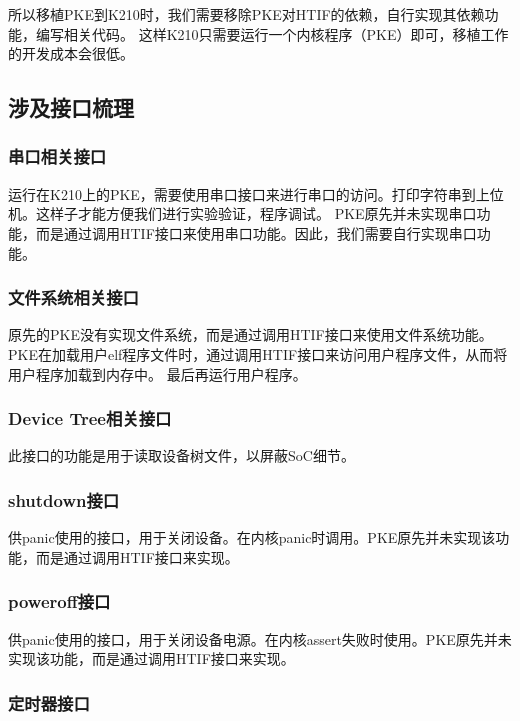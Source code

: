 所以移植PKE到K210时，我们需要移除PKE对HTIF的依赖，自行实现其依赖功能，编写相关代码。
这样K210只需要运行一个内核程序（PKE）即可，移植工作的开发成本会很低。

\subsection{涉及接口梳理}

\subsubsection{串口相关接口}
运行在K210上的PKE，需要使用串口接口来进行串口的访问。打印字符串到上位机。这样子才能方便我们进行实验验证，程序调试。
PKE原先并未实现串口功能，而是通过调用HTIF接口来使用串口功能。因此，我们需要自行实现串口功能。

\subsubsection{文件系统相关接口}

原先的PKE没有实现文件系统，而是通过调用HTIF接口来使用文件系统功能。
PKE在加载用户elf程序文件时，通过调用HTIF接口来访问用户程序文件，从而将用户程序加载到内存中。
最后再运行用户程序。

\subsubsection{Device Tree相关接口}

此接口的功能是用于读取设备树文件，以屏蔽SoC细节。

\subsubsection{shutdown接口}

供panic使用的接口，用于关闭设备。在内核panic时调用。PKE原先并未实现该功能，而是通过调用HTIF接口来实现。

\subsubsection{poweroff接口}

供panic使用的接口，用于关闭设备电源。在内核assert失败时使用。PKE原先并未实现该功能，而是通过调用HTIF接口来实现。

\subsubsection{定时器接口}

